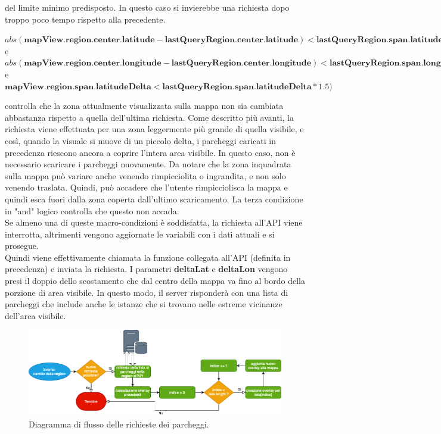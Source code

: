 del limite minimo predisposto. In questo caso si invierebbe una richiesta dopo troppo
poco tempo rispetto alla precedente.
\begin{center}
    $ abs(\textbf{mapView.region.center.latitude} - \textbf{lastQueryRegion.center.latitude}) < \textbf{lastQueryRegion.span.latitudeDelta}/2 $\\
    e\\
    $ abs(\textbf{mapView.region.center.longitude} - \textbf{lastQueryRegion.center.longitude}) < \textbf{lastQueryRegion.span.longitudeDelta}/2 $\\
    e\\
    $ \textbf{mapView.region.span.latitudeDelta} < \textbf{lastQueryRegion.span.latitudeDelta} * 1.5) $
\end{center} 
controlla che la zona attualmente visualizzata sulla mappa non sia cambiata abbastanza
rispetto a quella dell'ultima richiesta. Come descritto più avanti, la richiesta
viene effettuata per una zona leggermente più grande di quella visibile, e così, 
quando la visuale si muove di un piccolo delta, i parcheggi caricati in precedenza
riescono ancora a coprire l'intera area visibile. In questo caso, non è necessario
scaricare i parcheggi nuovamente. Da notare che la zona inquadrata sulla mappa può
variare anche venendo rimpicciolita o ingrandita, e non solo venendo traslata. Quindi,
può accadere che l'utente rimpicciolisca la mappa e quindi esca fuori dalla zona coperta
dall'ultimo scaricamento. La terza condizione in "and" logico controlla che questo
non accada.\\

Se almeno una di queste macro-condizioni è soddisfatta, la richiesta all'API viene 
interrotta, altrimenti vengono aggiornate le variabili con i dati attuali e si prosegue.\\
Quindi viene effettivamente chiamata la funzione collegata all'API (definita in precedenza)
e inviata la richiesta. I parametri \textbf{deltaLat} e \textbf{deltaLon} vengono presi 
il doppio dello scostamento che dal centro della mappa va fino al bordo della porzione
di area visibile. In questo modo, il server risponderà con una lista di parcheggi che 
include anche le istanze che si trovano nelle estreme vicinanze dell'area visibile.

\begin{figure}
    \centering
    \includegraphics[width=14cm]{images/flow_diagram_parkings_retrieval.png}
    \caption{Diagramma di flusso delle richieste dei parcheggi.}
    \label{fig:flow_diagram_parkings_retrieval}
\end{figure}


